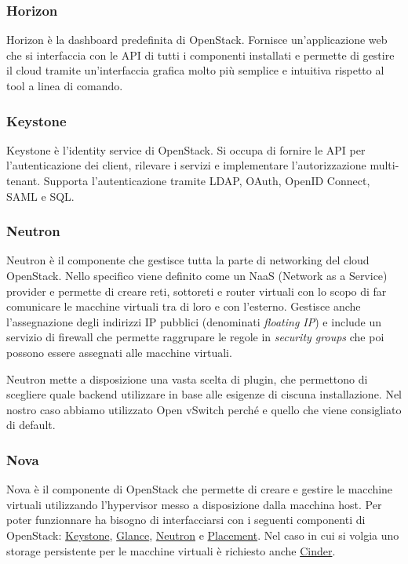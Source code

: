 \subsubsection{Horizon}
Horizon è la dashboard predefinita di OpenStack. Fornisce un'applicazione web che si interfaccia con le API di tutti i componenti installati e permette di gestire il cloud tramite un'interfaccia grafica molto più semplice e intuitiva rispetto al tool a linea di comando. 

\subsubsection{Keystone}\label{sec:openstack_keystone}
Keystone è l'identity service di OpenStack. Si occupa di fornire le API per l'autenticazione dei client, rilevare i servizi e implementare l'autorizzazione multi-tenant.
Supporta l'autenticazione tramite LDAP, OAuth, OpenID Connect, SAML e SQL.

\subsubsection{Neutron}\label{sec:openstack_neutron}
Neutron è il componente che gestisce tutta la parte di networking del cloud OpenStack. Nello specifico viene definito come un NaaS (Network as a Service) provider e permette di creare reti, sottoreti e router virtuali con lo scopo di far comunicare le macchine virtuali tra di loro e con l'esterno. Gestisce anche l'assegnazione degli indirizzi IP pubblici (denominati \textit{floating IP}) e include un servizio di firewall che permette raggrupare le regole in \textit{security groups} che poi possono essere assegnati alle macchine virtuali.

Neutron mette a disposizione una vasta scelta di plugin, che permettono di scegliere quale backend utilizzare in base alle esigenze di ciscuna installazione. Nel nostro caso abbiamo utilizzato Open vSwitch perché e quello che viene consigliato di default.

\subsubsection{Nova}
Nova è il componente di OpenStack che permette di creare e gestire le macchine virtuali utilizzando l'hypervisor messo a disposizione dalla macchina host. Per poter funzionnare ha bisogno di interfacciarsi con i seguenti componenti di OpenStack: \hyperref[sec:openstack_keystone]{Keystone}, \hyperref[sec:openstack_glance]{Glance}, \hyperref[sec:openstack_neutron]{Neutron} e \hyperref[sec:openstack_placement]{Placement}. Nel caso in cui si volgia uno storage persistente per le macchine virtuali è richiesto anche \hyperref[sec:openstack_cinder]{Cinder}.

